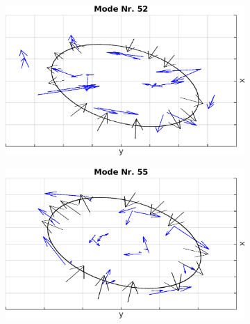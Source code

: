 \documentclass[numbers=noenddot,a4paper,notitlepage,twoside,BCOR15mm]{scrbook}
\begin{document}
							\begin{figure}[!t]
								\centering
								\begin{subfigure}[t]{0.325\textwidth}
									\centering
									\includegraphics[width=\textwidth,height=0.7\textwidth]{figs/auswertung/manipulation/quadrupol3HzModeNr52.png}
								\end{subfigure}
								\begin{subfigure}[t]{0.325\textwidth}
									\centering
									\includegraphics[width=\textwidth,height=0.7\textwidth]{figs/auswertung/manipulation/quadrupol3HzModeNr55.png}
								\end{subfigure}
								\begin{subfigure}[t]{0.325\textwidth}
									\centering

\end{subfigure}
\end{figure}
\end{document}
